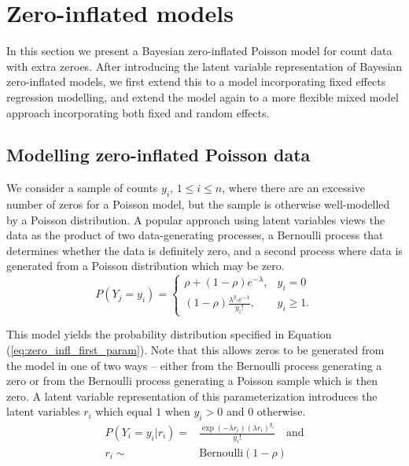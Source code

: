 \section{Zero-inflated models}
\label{sec:zero_inflated_model}

In this section we present a Bayesian zero-inflated Poisson model for count
data with extra zeroes. After introducing the latent variable representation of
Bayesian zero-inflated models, we first extend this to a model incorporating
fixed effects regression modelling, and extend the model again to a more
flexible mixed model approach incorporating both fixed and random effects.

\subsection{Modelling zero-inflated Poisson data}

We consider a sample of counts $y_i$, $1 \le i\le n$, where there are an
excessive number of zeros for a Poisson model, but the sample is otherwise
well-modelled by a Poisson distribution. A popular approach using latent
variables views the data as the product of two data-generating processes, a
Bernoulli process that determines whether the data is definitely zero, and a
second process where data is generated from a Poisson distribution which may be
zero.
\begin{equation}
\label{eq:zero_infl_first_param}
	P(Y_j = y_i) = \left\{ \begin{array}{ll}
        \rho + (1 - \rho) e^{-\lambda},  & y_i = 0 \\
	    (1 - \rho) \frac{\lambda^{y_i} e^{-\lambda}} {y_i!},  &y_i \ge 1.
	\end{array} \right.
\end{equation}

This model yields the probability distribution specified in Equation
(\ref{eq:zero_infl_first_param}).  Note that this allows zeros to be generated
from the model in one of two ways -- either from the Bernoulli process
generating a zero or from the Bernoulli process generating a Poisson sample
which is then zero. A latent variable representation of this parameterization
introduces the latent variables $r_i$ which equal $1$ when $y_i>0$ and $0$
otherwise. 
\begin{equation}
\label{eq:zero_infl_second_param}
\begin{array}{rl}
	P(Y_i=y_i|r_i) = & \frac{\exp(-\lambda r_i)(\lambda r_i)^{y_i}}{y_i!} \quad \mbox{and} \\
	r_i \sim & \mbox{Bernoulli}(1-\rho)
\end{array}
\end{equation}


